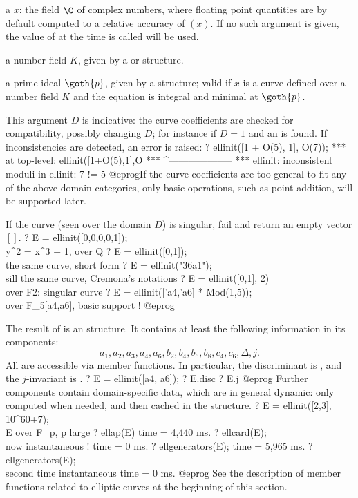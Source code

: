 \item a  $x$: the field $\C$ of complex numbers, where floating
point quantities are by default computed to a relative accuracy of
$(x)$. If no such argument is given, the value of
 at the time  is called will be used.

\item a number field $K$, given by a  or  structure.

\item a prime ideal $\goth{p}$, given by a  structure; valid if
$x$ is a curve defined over a number field $K$ and the equation is integral
and minimal at $\goth{p}$.

This argument $D$ is indicative: the curve coefficients are checked for
compatibility, possibly changing $D$; for instance if $D = 1$ and
an  is found. If inconsistencies are detected, an error is
raised:
\bprog
? ellinit([1 + O(5), 1], O(7));
 ***   at top-level: ellinit([1+O(5),1],O
 ***                 ^--------------------
 *** ellinit: inconsistent moduli in ellinit: 7 != 5
@eprog\noindent If the curve coefficients are too general to fit any of the
above domain categories, only basic operations, such as point addition, will
be supported later.

If the curve (seen over the domain $D$) is singular, fail and return an
empty vector $[]$.
\bprog
? E = ellinit([0,0,0,0,1]); \\ y^2 = x^3 + 1, over Q
? E = ellinit([0,1]);       \\ the same curve, short form
? E = ellinit("36a1");      \\ sill the same curve, Cremona's notations
? E = ellinit([0,1], 2)     \\ over F2: singular curve
? E = ellinit(['a4,'a6] * Mod(1,5));  \\ over F_5[a4,a6], basic support !
@eprog\noindent

The result of  is an  structure. It contains at least
the following information in its components:
%
$$ a_1,a_2,a_3,a_4,a_6,b_2,b_4,b_6,b_8,c_4,c_6,\Delta,j.$$
%
All are accessible via member functions. In particular, the discriminant is
, and the $j$-invariant is .
\bprog
? E = ellinit([a4, a6]);
? E.disc
? E.j
@eprog
Further components contain domain-specific data, which are in general dynamic:
only computed when needed, and then cached in the structure.
\bprog
? E = ellinit([2,3], 10^60+7);  \\ E over F_p, p large
? ellap(E)
time = 4,440 ms.
? ellcard(E);  \\ now instantaneous !
time = 0 ms.
? ellgenerators(E);
time = 5,965 ms.
? ellgenerators(E); \\ second time instantaneous
time = 0 ms.
@eprog
See the description of member functions related to elliptic curves at the
beginning of this section.

